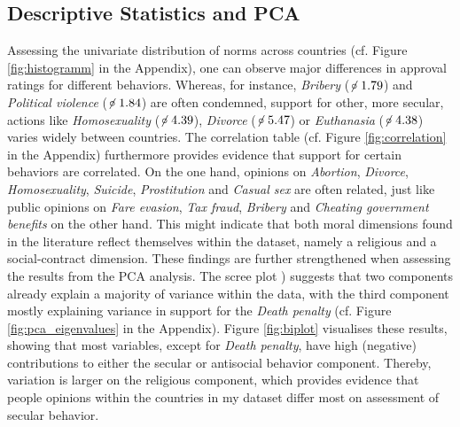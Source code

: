 \documentclass{article}[hidelinks]
\begin{document}
\subsection{Descriptive Statistics and PCA}
Assessing the univariate distribution of norms across countries (cf. Figure \ref{fig:histogramm} in the Appendix), one can observe major differences in approval ratings for different behaviors. Whereas, for instance, \emph{Bribery} ($\not\!\circ \; 1.79$) and \emph{Political violence} ($\not\!\circ \; 1.84$) are often condemned, support for other, more secular, actions like \emph{Homosexuality} ($\not\!\circ \;  4.39$), \emph{Divorce} ($\not\!\circ \; 5.47$) or \emph{Euthanasia} ($\not\!\circ \; 4.38$) varies widely between countries. The correlation table (cf. Figure \ref{fig:correlation} in the Appendix) furthermore provides evidence that support for certain behaviors are correlated. On the one hand, opinions on \emph{Abortion}, \emph{Divorce}, \emph{Homosexuality}, \emph{Suicide}, \emph{Prostitution} and \emph{Casual sex} are often related, just like public opinions on \emph{Fare evasion}, \emph{Tax fraud}, \emph{Bribery} and \emph{Cheating government benefits} on the other hand. This might indicate that both moral dimensions found in the literature reflect themselves within the dataset, namely a religious and a social-contract dimension.
These findings are further strengthened when assessing the results from the PCA analysis. The scree plot \citep{ferre1995selection}) suggests that two components already explain a majority of variance within the data, with the third component mostly explaining variance in support for the \emph{Death penalty} (cf. Figure \ref{fig:pca_eigenvalues} in the Appendix). Figure \ref{fig:biplot} visualises these results, showing that most variables, except for \emph{Death penalty}, have high (negative) contributions to either the secular or antisocial behavior component. Thereby, variation is larger on the religious component, which provides evidence that people opinions within the countries in my dataset differ most on assessment of secular behavior.  
\end{document}

